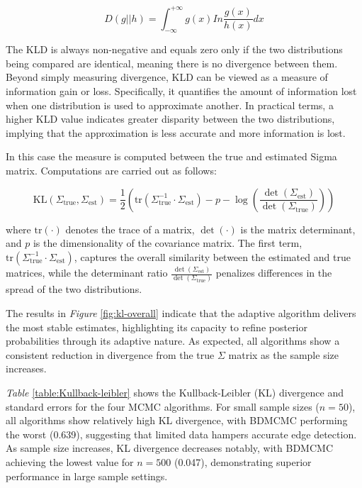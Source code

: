 \documentclass{report}
\begin{document}
$$
D(g || h) = \int^{+\infty}_{-\infty} g(x) In \frac{g(x)}{h(x)} dx
$$

The KLD is always non-negative and equals zero only if the two distributions  being compared are identical, meaning there is no divergence between them.  Beyond simply measuring divergence, KLD can be viewed as a measure of information gain or loss. Specifically, it quantifies the amount of information lost when one distribution is used to approximate another. In practical terms, a higher KLD value indicates greater disparity between the two distributions, implying that the approximation is less accurate and more information is lost.

In this case the measure is computed between the true and estimated Sigma matrix. Computations are carried out as follows: 

$$
\text{KL}(\Sigma_{\text{true}}, \Sigma_{\text{est}}) = \frac{1}{2} \left( \text{tr}\left( \Sigma_{\text{true}}^{-1} \cdot \Sigma_{\text{est}} \right) - p - \log \left( \frac{\det(\Sigma_{\text{est}})}{\det(\Sigma_{\text{true}})} \right) \right)
$$

where $\text{tr}(\cdot)$ denotes the trace of a matrix, $\det(\cdot)$ is the matrix determinant, and $p$ is the dimensionality of the covariance matrix. The first term, $\text{tr}\left( \Sigma_{\text{true}}^{-1} \cdot \Sigma_{\text{est}} \right)$, captures the overall similarity between the estimated and true matrices, while the determinant ratio $\frac{\det(\Sigma_{\text{est}})}{\det(\Sigma_{\text{true}})}$ penalizes differences in the spread of the two distributions. 

The results in \textit{Figure} \ref{fig:kl-overall} indicate that the adaptive algorithm delivers the most stable estimates, highlighting its capacity to refine posterior probabilities through its adaptive nature. As expected, all algorithms show a consistent reduction in divergence from the true $\Sigma$ matrix as the sample size increases.

\textit{Table} \ref{table:Kullback-leibler} shows the Kullback-Leibler (KL) divergence and standard errors for the four MCMC algorithms.
For small sample sizes ($n = 50$), all algorithms show relatively high KL divergence, with BDMCMC performing the worst (0.639), suggesting that limited data hampers accurate edge detection. As sample size increases, KL divergence decreases notably, with BDMCMC achieving the lowest value for $n = 500$ (0.047), demonstrating superior performance in large sample settings.
\end{document}

